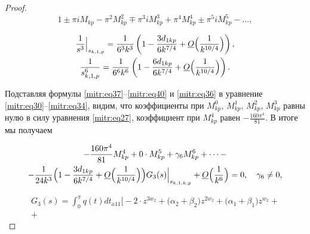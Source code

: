 \begin{proof}
\begin{equation}
1 \pm \pi i M_{kp}-\pi^2 M^2_{kp}\mp \pi^3 i M^3_{kp}+\pi^4M^4_{kp}\pm \pi^5 iM^5_{kp}-\dots,

\end{equation}

\begin{equation}

\label{mitr:eq40}

\begin{gathered}

\frac1{s^3}

\Big|_{s_{k,1,p}}=\frac{1}{6^3k^3}\left(1-\frac{3d_{1kp}}{6k^{7/4}}+\underline O\Bigl(\frac1{k^{10/4}}\Bigr)\right),  \\

\frac1{s^6_{k,1,p}} =\frac{1}{6^6k^6}\left(1-\frac{6 d_{1kp}}{6k^{7/4}}

+\underline O\Bigl(\frac1{k^{10/4}}\Bigr)\right).

\end{gathered}

\end{equation}





Подставляя формулы \eqref{mitr:eq37}--\eqref{mitr:eq40} и \eqref{mitr:eq36} в уравнение \eqref{mitr:eq30}--\eqref{mitr:eq34}, видим, что коэффициенты при $M^0_{kp}$, $M^1_{kp}$, $M^2_{kp}$, $M^3_{kp}$ равны нулю в силу уравнения \eqref{mitr:eq27}, коэффициент при $M^4_{kp}$ равен $-\frac{160\pi^4}{81}$. В итоге мы получаем

\begin{multline}

\label{mitr:eq41}

-\frac{160\pi^4}{81}M^4_{kp}+0\cdot M^5_{kp}+\gamma_6M^6_{kp}+\dots-\\-

\frac1{24k^3}\Bigl(1-\frac{3d_{1kp}}{6k^{7/4}}

+\underline O\Bigl(\frac1{k^{10/4}}\Bigr)\Bigr) G_3(s)\Big|_{s_{k,1,k,p}} +

\underline O\Bigl(\frac1{k^6}\Bigr)=0, \quad \gamma_6\ne0,

\end{multline}

\begin{multline}

\label{mitr:eq42}

G_3(s)=\int ^\pi_0 q(t)dt_{a11}

\Big[-2\cdot z^{3w_2}+ \big(\alpha_2+\beta_2\big) z^{2w_2}+\big(\alpha_1+\beta_1\big)z^{w_2}+\\+


\end{multline}
\end{proof}
